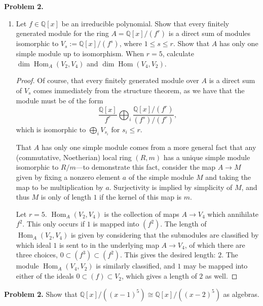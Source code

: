 \documentclass[reqno]{amsart}
\DeclareMathOperator{\Hom}{Hom}
\theoremstyle{definition}
\theoremstyle{remark}
\newcommand{\prob}[1] {
  \textbf{Problem #1.}
}
\begin{document}
\prob{2}
\begin{enumerate}
  \item Let $f \in \mathbb{Q}[x]$ be an irreducible polynomial. Show that every
    finitely generated module for the ring $A = \mathbb{Q}[x]/(f^r)$ is a direct
    sum of modules isomorphic to $V_s := \mathbb{Q}[x]/(f^s)$, where $1 \leq s
    \leq r$. Show that $A$ has only one simple module up to isomorphism. When $r
    = 5$, calculate $\dim \Hom_A(V_2, V_4)$ and $\dim \Hom(V_4, V_2)$.

    \begin{proof}
      Of course, that every finitely generated module over $A$ is a direct sum
      of $V_s$ comes immediately from the structure theorem, as we have that the
      module must be of the form
      \[
        \frac{\mathbb{Q}[x]}{f^r} \bigoplus_i
        \frac{\mathbb{Q}[x]/(f^r)}{(f^s)/(f^r)},
      \]
      which is isomorphic to $\bigoplus_i V_{s_i}$ for $s_i \leq r$.

      That $A$ has only one simple module comes from a more general fact that
      any (commutative, Noetherian) local ring $(R, m)$ has a unique simple
      module isomorphic to $R/m$---to demonstrate this fact, consider the map $A
      \to M$ given by fixing a nonzero element $a$ of the simple module $M$ and
      taking the map to be multiplication by $a$. Surjectivity is implied by
      simplicity of $M$, and thus $M$ is only of length $1$ if the kernel of
      this map is $m$.

      Let $r=5$. $\Hom_A(V_2, V_4)$ is the collection of maps $A \to V_4$ which
      annihilate $f^2$. This only occurs if $1$ is mapped into $(f^2)$. The
      length of $\Hom_A(V_2, V_4)$ is given by considering that the submodules
      are classified by which ideal $1$ is sent to in the underlying map $A \to
      V_4$, of which there are three choices, $0 \subset (f^3) \subset (f^2)$.
      This gives the desired length: $2$. The module $\Hom_A(V_4, V_2)$ is
      similarly classified, and $1$ may be mapped into either of the ideals $0
      \subset (f) \subset V_2$, which gives a length of $2$ as well.
    \end{proof}
\end{enumerate}

\prob{2} Show that $\mathbb{Q}[x]/((x-1)^5) \cong \mathbb{Q}[x]/((x-2)^5)$ as
algebras.
\end{document}
